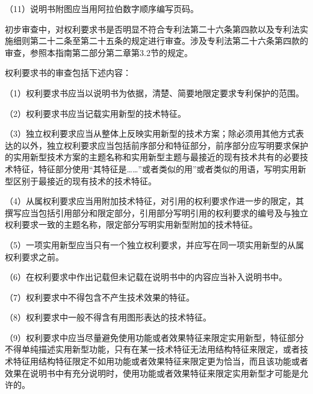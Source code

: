 {\setlength{\parindent}{17.1bp}（11）说明书附图应当用阿拉伯数字顺序编写页码。\par}

初步审查中，对权利要求书是否明显不符合专利法第二十六条第四款以及专利法实施细则第二十二条至第二十五条的规定进行审查。涉及专利法第二十六条第四款的审查，参照本指南第二部分第二章第3.2节的规定。

权利要求书的审查包括下述内容：

{\setlength{\parindent}{17.1bp}（1）权利要求书应当以说明书为依据，清楚、简要地限定要求专利保护的范围。\par}

{\setlength{\parindent}{17.1bp}（2）权利要求书应当记载实用新型的技术特征。\par}

{\setlength{\parindent}{17.1bp}（3）独立权利要求应当从整体上反映实用新型的技术方案；除必须用其他方式表达的以外，独立权利要求应当包括前序部分和特征部分，前序部分应写明要求保护的实用新型技术方案的主题名称和实用新型主题与最接近的现有技术共有的必要技术特征，特征部分使用“其特征是……”或者类似的用”或者类似的用语，写明实用新型区别于最接近的现有技术的技术特征。\par}

{\setlength{\parindent}{17.1bp}（4）从属权利要求应当用附加技术特征，对引用的权利要求作进一步的限定，其撰写应当包括引用部分和限定部分，引用部分写明引用的权利要求的编号及与独立权利要求一致的主题名称，限定部分写明实用新型附加的技术特征。\par}

{\setlength{\parindent}{17.1bp}（5）一项实用新型应当只有一个独立权利要求，并应写在同一项实用新型的从属权利要求之前。\par}

{\setlength{\parindent}{17.1bp}（6）在权利要求中作出记载但未记载在说明书中的内容应当补入说明书中。\par}

{\setlength{\parindent}{17.1bp}（7）权利要求中不得包含不产生技术效果的特征。\par}

{\setlength{\parindent}{17.1bp}（8）权利要求中一般不得含有用图形表达的技术特征。\par}

{\setlength{\parindent}{17.1bp}（9）权利要求中应当尽量避免使用功能或者效果特征来限定实用新型，特征部分不得单纯描述实用新型功能，只有在某一技术特征无法用结构特征来限定，或者技术特征用结构特征限定不如用功能或者效果特征来限定更为恰当，而且该功能或者效果在说明书中有充分说明时，使用功能或者效果特征来限定实用新型才可能是允许的。\par}

